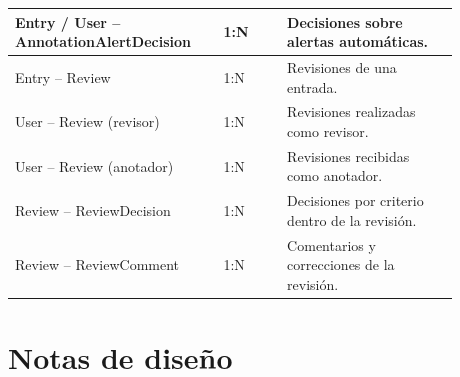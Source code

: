 \begin{longtable}{|p{0.40\linewidth}|p{0.13\linewidth}|p{0.35\linewidth}|}
	Entry / User -- AnnotationAlertDecision & 1:N            & Decisiones sobre alertas automáticas.                                                       \\ \hline
	Entry -- Review                         & 1:N            & Revisiones de una entrada.                                                                  \\ \hline
	User -- Review (revisor)                & 1:N            & Revisiones realizadas como revisor.                                                         \\ \hline
	User -- Review (anotador)               & 1:N            & Revisiones recibidas como anotador.                                                         \\ \hline
	Review -- ReviewDecision                & 1:N            & Decisiones por criterio dentro de la revisión.                                              \\ \hline
	Review -- ReviewComment                 & 1:N            & Comentarios y correcciones de la revisión.                                                  \\ \hline
\end{longtable}

\section{Notas de diseño}

